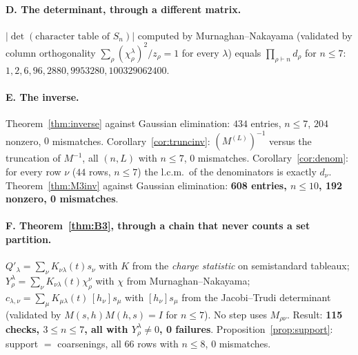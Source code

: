 \documentclass[11pt]{article}
\theoremstyle{definition}
\newcommand{\lam}{\lambda}
\newcommand{\Qp}{Q'}
\begin{document}
\paragraph{D. The determinant, through a different matrix.} $|\det(\text{character table of }S_n)|$
computed by Murnaghan--Nakayama (validated by column orthogonality
$\sum_\rho(\chi^\lam_\rho)^2/z_\rho=1$ for every $\lam$) equals $\prod_{\rho\vdash n}d_\rho$ for
$n\le7$: $1,2,6,96,2880,9953280,100329062400$.

\paragraph{E. The inverse.} Theorem~\ref{thm:inverse} against Gaussian elimination: $434$ entries,
$n\le7$, $204$ nonzero, $0$ mismatches. Corollary~\ref{cor:truncinv}: $(M^{(L)})^{-1}$ versus the
truncation of $M^{-1}$, all $(n,L)$ with $n\le7$, $0$ mismatches. Corollary~\ref{cor:denom}: for
every row $\nu$ ($44$ rows, $n\le7$) the l.c.m.\ of the denominators is exactly $d_\nu$.
Theorem~\ref{thm:M3inv} against Gaussian elimination: \textbf{608 entries, $n\le10$, 192 nonzero, 0
mismatches}.

\paragraph{F. Theorem~\ref{thm:B3}, through a chain that never counts a set partition.}
$\Qp_\lam=\sum_\nu K_{\nu\lam}(t)s_\nu$ with $K$ from the \emph{charge statistic} on semistandard
tableaux; $Y^\lam_\rho=\sum_\nu K_{\nu\lam}(t)\chi^\nu_\rho$ with $\chi$ from
Murnaghan--Nakayama; $c_{\lam,\nu}=\sum_\mu K_{\mu\lam}(t)\,[h_\nu]s_\mu$ with $[h_\nu]s_\mu$ from
the Jacobi--Trudi determinant (validated by $M(s,h)M(h,s)=I$ for $n\le7$). No step uses
$M_{\rho\nu}$. Result: \textbf{115 checks, $3\le n\le7$, all with $Y^\lam_\rho\ne0$, 0 failures}.
Proposition~\ref{prop:support}: support $=$ coarsenings, all $66$ rows with $n\le8$, $0$ mismatches.
\end{document}
